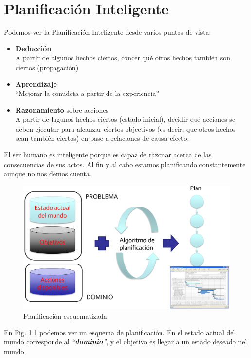 \chapter{Planificación Inteligente}

Podemos ver la Planificación Inteligente desde varios puntos de vista:
\begin{itemize}
   \item \textbf{Deducción}\\
   A partir de algunos hechos ciertos, concer qué otros hechos también son ciertos (propagación)
   \item \textbf{Aprendizaje}\\
   ``Mejorar la conudcta a partir de la experiencia''
   \item \textbf{Razonamiento} sobre acciones\\
   A partir de lagunos hechos ciertos (estado inicial), decidir qué acciones se deben ejecutar para alcanzar ciertos objectivos (es decir, que otros hechos sean también ciertos) en base a relaciones de causa-efecto. 
\end{itemize}

El ser humano es inteligente porque es capaz de razonar acerca de las consecuencias de sus actos. Al fin y al cabo estamos planificando constantemente aunque no nos demos cuenta.


\begin{figure}[htbp]
   \centering
   \includegraphics{images/02/planificacion.png}
   \caption{Planificación esquematizada}
   \label{fig:02/planificacion}
\end{figure}


En Fig. \ref{fig:02/planificacion} podemos ver un esquema de planificación. En el estado actual del mundo corresponde al \textit{``\textbf{dominio}''}, y el objetivo es llegar a un estado deseado nel mundo.



